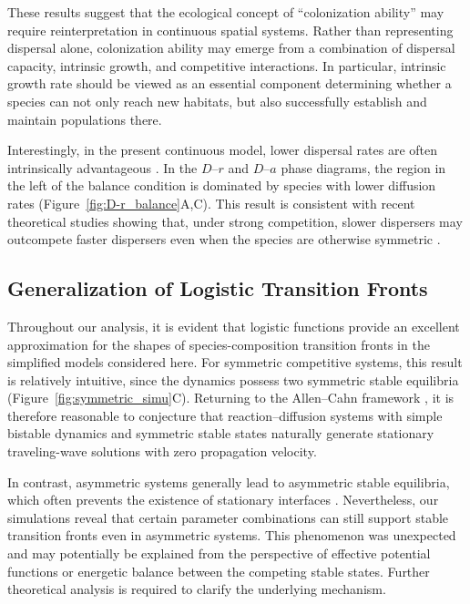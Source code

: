 These results suggest that the ecological concept of ``colonization ability'' may require reinterpretation in continuous spatial systems. Rather than representing dispersal alone, colonization ability may emerge from a combination of dispersal capacity, intrinsic growth, and competitive interactions. In particular, intrinsic growth rate should be viewed as an essential component determining whether a species can not only reach new habitats, but also successfully establish and maintain populations there.

Interestingly, in the present continuous model, lower dispersal rates are often intrinsically advantageous \citep{risler_competition_2017}. In the $D$--$r$ and $D$--$a$ phase diagrams, the region in the left of the balance condition is dominated by species with lower diffusion rates (Figure~\ref{fig:D-r_balance}A,C). This result is consistent with recent theoretical studies showing that, under strong competition, slower dispersers may outcompete faster dispersers even when the species are otherwise symmetric \citep{nakamura_propagation_2025}.



\subsection{Generalization of Logistic Transition Fronts}

Throughout our analysis, it is evident that logistic functions provide an excellent approximation for the shapes of species-composition transition fronts in the simplified models considered here. For symmetric competitive systems, this result is relatively intuitive, since the dynamics possess two symmetric stable equilibria (Figure~\ref{fig:symmetric_simu}C). Returning to the Allen--Cahn framework \citep{allen_coherent_1975}, it is therefore reasonable to conjecture that reaction--diffusion systems with simple bistable dynamics and symmetric stable states naturally generate stationary traveling-wave solutions with zero propagation velocity.

In contrast, asymmetric systems generally lead to asymmetric stable equilibria, which often prevents the existence of stationary interfaces \citep{gardner_existence_1982, hou_traveling_2008}. Nevertheless, our simulations reveal that certain parameter combinations can still support stable transition fronts even in asymmetric systems. This phenomenon was unexpected and may potentially be explained from the perspective of effective potential functions or energetic balance between the competing stable states. Further theoretical analysis is required to clarify the underlying mechanism.

